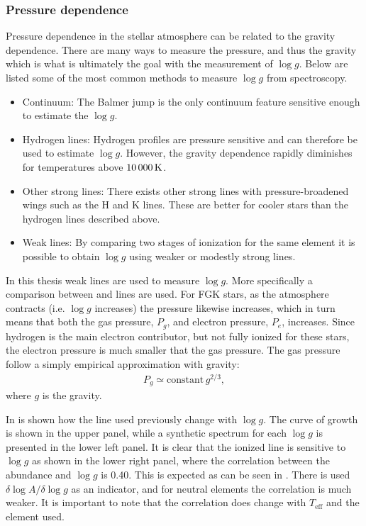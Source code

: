\subsubsection{Pressure dependence}

Pressure dependence in the stellar atmosphere can be related to the gravity
dependence. There are many ways to measure the pressure, and thus the gravity
which is what is ultimately the goal with the measurement of $\log g$. Below are
listed some of the most common methods to measure $\log g$ from spectroscopy.

\begin{itemize}
  \item Continuum: The Balmer jump is the only continuum feature sensitive
        enough to estimate the $\log g$.
  \item Hydrogen lines: Hydrogen profiles are pressure sensitive and can
        therefore be used to estimate $\log g$. However, the gravity dependence
        rapidly diminishes for temperatures above $\SI{10\,000}{K}$.
  \item Other strong lines: There exists other strong lines with
        pressure-broadened wings such as the  H and K lines. These
        are better for cooler stars than the hydrogen lines described above.
  \item Weak lines: By comparing two stages of ionization for the same element
        it is possible to obtain $\log g$ using weaker or modestly strong lines.
\end{itemize}
In this thesis weak lines are used to measure $\log g$. More specifically a
comparison between  and  lines are used. For FGK stars,
as the atmosphere contracts (i.e. $\log g$ increases) the pressure likewise
increases, which in turn means that both the gas pressure, $P_g$, and electron
pressure, $P_e$, increases. Since hydrogen is the main electron contributor, but
not fully ionized for these stars, the electron pressure is much smaller that
the gas pressure. The gas pressure follow a simply empirical approximation with
gravity:
\begin{align}
  P_g \simeq \mathrm{constant}\, g^{2/3},
\end{align}
where $g$ is the gravity.

In  is shown how the  line used previously
change with $\log g$. The curve of growth is shown in the upper panel, while a
synthetic spectrum for each $\log g$ is presented in the lower left panel. It is
clear that the ionized line is sensitive to $\log g$ as shown in the lower right
panel, where the correlation between the abundance and $\log g$ is 0.40. This is
expected as can be seen in \citet[][Table 16.1]{Gray2006}. There is used
$\delta\log A/\delta\log g$ as an indicator, and for neutral elements the
correlation is much weaker. It is important to note that the correlation does
change with $T_\mathrm{eff}$ and the element used.

